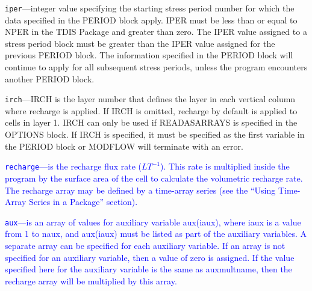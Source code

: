 \begin{description}
\item \texttt{iper}---integer value specifying the starting stress period number for which the data specified in the PERIOD block apply.  IPER must be less than or equal to NPER in the TDIS Package and greater than zero.  The IPER value assigned to a stress period block must be greater than the IPER value assigned for the previous PERIOD block.  The information specified in the PERIOD block will continue to apply for all subsequent stress periods, unless the program encounters another PERIOD block.

\item \texttt{irch}---IRCH is the layer number that defines the layer in each vertical column where recharge is applied. If IRCH is omitted, recharge by default is applied to cells in layer 1.  IRCH can only be used if READASARRAYS is specified in the OPTIONS block.  If IRCH is specified, it must be specified as the first variable in the PERIOD block or MODFLOW will terminate with an error.

\item \textcolor{blue}{\texttt{recharge}---is the recharge flux rate ($LT^{-1}$).  This rate is multiplied inside the program by the surface area of the cell to calculate the volumetric recharge rate. The recharge array may be defined by a time-array series (see the ``Using Time-Array Series in a Package'' section).}

\item \textcolor{blue}{\texttt{aux}---is an array of values for auxiliary variable aux(iaux), where iaux is a value from 1 to naux, and aux(iaux) must be listed as part of the auxiliary variables.  A separate array can be specified for each auxiliary variable.  If an array is not specified for an auxiliary variable, then a value of zero is assigned.  If the value specified here for the auxiliary variable is the same as auxmultname, then the recharge array will be multiplied by this array.}

\end{description}

